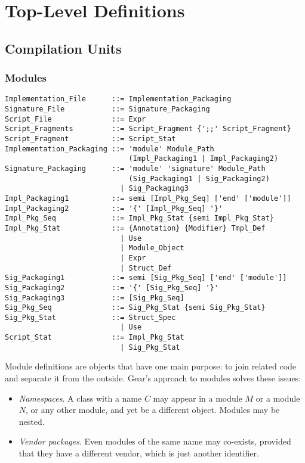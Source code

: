 
\chapter{Top-Level Definitions}

\minitoc

\newpage

\section{Compilation Units}
\label{sec:compilation-units}

\subsection{Modules}
\label{sec:modules}

\syntax\begin{lstlisting}
Implementation_File      ::= Implementation_Packaging
Signature_File           ::= Signature_Packaging
Script_File              ::= Expr
Script_Fragments         ::= Script_Fragment {';;' Script_Fragment}
Script_Fragment          ::= Script_Stat
Implementation_Packaging ::= 'module' Module_Path 
                             (Impl_Packaging1 | Impl_Packaging2)
Signature_Packaging      ::= 'module' 'signature' Module_Path
                             (Sig_Packaging1 | Sig_Packaging2)
                           | Sig_Packaging3
Impl_Packaging1          ::= semi [Impl_Pkg_Seq] ['end' ['module']]
Impl_Packaging2          ::= '{' [Impl_Pkg_Seq] '}'
Impl_Pkg_Seq             ::= Impl_Pkg_Stat {semi Impl_Pkg_Stat}
Impl_Pkg_Stat            ::= {Annotation} {Modifier} Tmpl_Def
                           | Use
                           | Module_Object
                           | Expr
                           | Struct_Def
Sig_Packaging1           ::= semi [Sig_Pkg_Seq] ['end' ['module']]
Sig_Packaging2           ::= '{' [Sig_Pkg_Seq] '}'
Sig_Packaging3           ::= [Sig_Pkg_Seq]
Sig_Pkg_Seq              ::= Sig_Pkg_Stat {semi Sig_Pkg_Stat}
Sig_Pkg_Stat             ::= Struct_Spec
                           | Use
Script_Stat              ::= Impl_Pkg_Stat
                           | Sig_Pkg_Stat
\end{lstlisting}

Module definitions are objects that have one main purpose: to join related code and separate it from the outside. Gear's approach to modules solves these issues: 
\begin{itemize}
  \item {\em Namespaces}. A class with a name $C$ may appear in a module $M$ or a module $N$, or any other module, and yet be a different object. Modules may be nested.
  \item {\em Vendor packages}. Even modules of the same name may co-exists, provided that they have a different vendor, which is just another identifier. 
\end{itemize}

